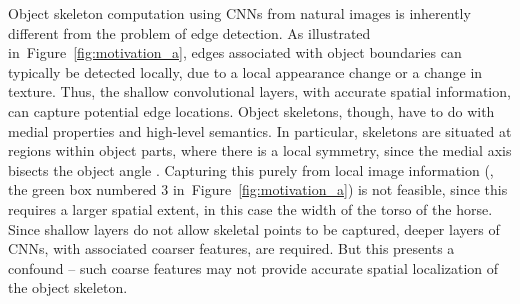 \documentclass[10pt,twocolumn,letterpaper]{article}
\newcommand\todo[1]{\textcolor{red}{#1}}
\newcommand{\reffig}[1]{Figure~\ref{#1}}
\begin{document}


Object skeleton computation using CNNs from natural images is inherently different from the problem of edge detection. As illustrated in~\reffig{fig:motivation_a}, edges associated with object boundaries can typically be detected locally, due to a local appearance change or a change in texture. Thus, the shallow convolutional layers, with accurate spatial information, can capture potential edge locations. Object skeletons, though, have to do with medial properties and high-level semantics. In particular, skeletons are situated at regions within object parts, where there is a local symmetry, since the medial axis bisects the object angle \cite{siddiqi2008}. Capturing this purely from local image information (\eg, the green box numbered 3 in~\reffig{fig:motivation_a}) is not feasible, since this requires a larger spatial extent, in this case the width of the torso of the horse. Since shallow layers do not allow skeletal points to be captured, deeper layers of CNNs, with associated coarser features, are required.
But this presents a confound -- such coarse features may not provide accurate spatial localization of the object skeleton.
\end{document}
